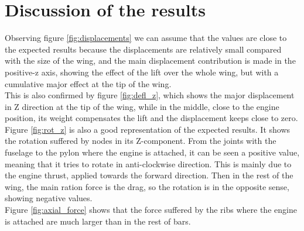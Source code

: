 \clearpage

\section{Discussion of the results}

Observing figure \ref{fig:displacements} we can assume that the values are close
to the expected results because the displacements are relatively small compared
with the size of the wing, and the main displacement contribution is made
in the positive-z axis, showing the effect of the lift over the whole wing, but with
a cumulative major effect at the tip of the wing.\\

This is also confirmed by figure \ref{fig:defl_z}, which shows the major displacement
in Z direction at the tip of the wing, while in the middle, close to the engine position,
its weight compensates the lift and the displacement keeps close to zero.\\

Figure \ref{fig:rot_z} is also a good representation of the expected results.
It shows the rotation suffered by nodes in its Z-component. From the joints with the
fuselage to the pylon where the engine is attached, it can be seen a positive value,
meaning that it tries to rotate in anti-clockwise direction. This is mainly due to
the engine thrust, applied towards the forward direction. Then in the rest of the wing,
the main ration force is the drag, so the rotation is in the opposite sense, showing
negative values.\\

Figure \ref{fig:axial_force} shows that the force suffered by the ribs where the
engine is attached are much larger than in the rest of bars.\\
